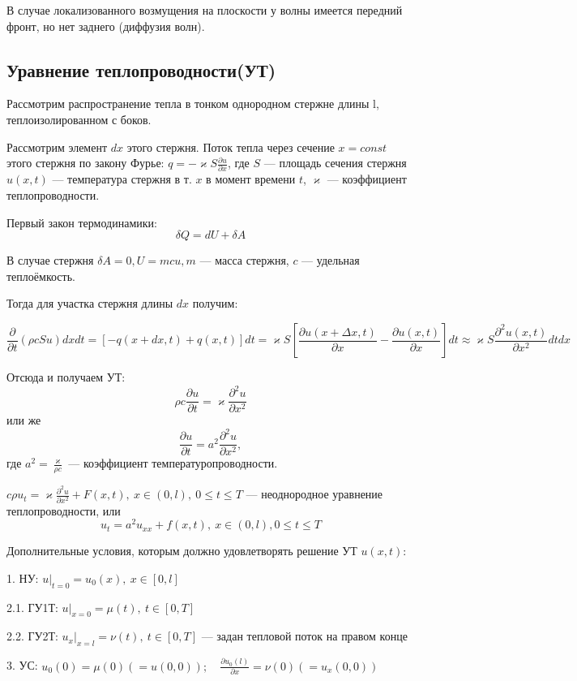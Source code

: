 \begin{note}
	В случае локализованного возмущения на плоскости у волны имеется передний фронт, но нет заднего (диффузия волн).
\end{note}

\subsection{Уравнение теплопроводности(УТ)}

Рассмотрим распространение тепла в тонком однородном стержне длины l, теплоизолированном с боков.

Рассмотрим элемент $dx$ этого стержня. Поток тепла через сечение $x=const$ этого стержня по закону Фурье:
$q = -\varkappa S \frac{\partial u}{\partial x}$, где $S$ --- площадь сечения стержня $u(x, t)$ --- температура стержня в т. $x$ в момент времени $t$, $\varkappa$ --- коэффициент теплопроводности.

Первый закон термодинамики:
\[
	\delta Q = dU + \delta A
\]

В случае стержня $\delta A = 0, U = mcu, m$ --- масса стержня, $c$ --- удельная теплоёмкость.

Тогда для участка стержня длины $dx$ получим:

\[
	\frac{\partial}{\partial t} (\rho cSu)dxdt = [-q(x+dx, t) + q(x, t)]dt =
	\varkappa S \left[ \frac{\partial u(x+\Delta x, t)}{\partial x} - \frac{\partial u(x, t)}{\partial x} \right] dt \approx \varkappa S \frac{\partial^2 u(x, t)}{\partial x^2}dtdx
\]

Отсюда и получаем УТ:
\[
	\rho c \frac{\partial u}{\partial t} = \varkappa \frac{\partial^2 u}{\partial x^2}
\]
или же
\[
	\frac{\partial u}{\partial t} = a^2 \frac{\partial^2 u}{\partial x^2},
\]
где $a^2 = \frac{\varkappa}{\rho c}$ --- коэффициент температуропроводности.

$c\rho u_t = \varkappa \frac{\partial^2 u}{\partial x^2} + F(x, t),\ x \in (0, l),\ 0 \le t \le T$ --- неоднородное уравнение теплопроводности, или
\[
	u_t = a^2 u_{xx} + f(x, t),\ x \in (0, l), 0 \le t \le T
\]

Дополнительные условия, которым должно удовлетворять решение УТ $u(x, t)$:

1. НУ: $u|_{t=0} = u_0(x),\ x \in [0, l]$

2.1. ГУ1Т: $u|_{x=0} = \mu(t),\ t \in [0, T]$

2.2. ГУ2Т: $u_x|_{x=l} = \nu(t),\ t \in [0, T]$ --- задан тепловой поток на правом конце

3. УС: $u_0(0) = \mu(0) (=u(0, 0));\quad \frac{\partial u_0(l)}{\partial x} = \nu(0) (=u_x(0, 0))$
